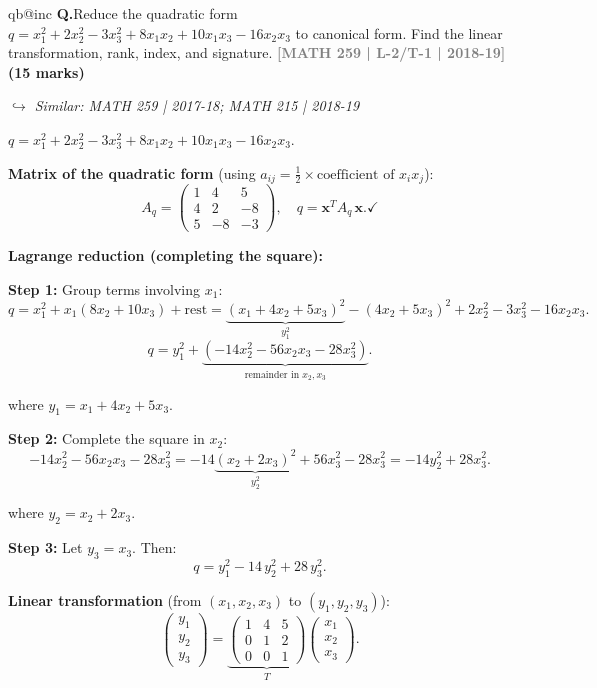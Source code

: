 \documentclass[12pt,a3paper]{article}
\makeatletter
\newcommand{\yr}[1]{\hfill\textcolor{gray}{\small\textbf{[#1]}}}
\newcommand{\mk}[1]{\textcolor{orange!70!black}{\small\textbf{(#1 marks)}}}
\newcommand{\variant}[1]{\par\vspace{1pt}\textcolor{blue!50!black}%
  {\footnotesize\textit{$\hookrightarrow$ Similar: #1}}}
\newcounter{qnum}
\newcommand{\Q}[1]{%
  \csname qb@inc\endcsname
  \needspace{4\baselineskip}
  \refstepcounter{qnum}
  \vspace{6pt}
  \noindent\textbf{Q\theqnum.}\enspace #1\par
}
\makeatother
\begin{document}
\Q{Reduce the quadratic form $q = x_1^2 + 2x_2^2 - 3x_3^2 + 8x_1x_2 + 10x_1x_3 - 16x_2x_3$ to canonical form. Find the linear transformation, rank, index, and signature.
\yr{MATH 259 | L-2/T-1 | 2018-19} \mk{15}
\variant{MATH 259 | 2017-18; MATH 215 | 2018-19}}

\begin{tcolorbox}[enhanced,breakable,
  colback=cE!4,colframe=cE,boxrule=0.8pt,arc=5pt,
  title={\textbf{Answer --- Quadratic Form: Canonical Reduction, Rank, Index, Signature}},
  fonttitle=\bfseries\color{white},colbacktitle=cE]
 
$q = x_1^2+2x_2^2-3x_3^2+8x_1x_2+10x_1x_3-16x_2x_3$.
 
\textbf{Matrix of the quadratic form} (using $a_{ij}=\tfrac{1}{2}\times\text{coefficient of }x_ix_j$):
\[
A_q = \begin{pmatrix}1&4&5\\4&2&-8\\5&-8&-3\end{pmatrix}, \quad
q = \mathbf{x}^T A_q\,\mathbf{x}. \checkmark
\]
 
\medskip
\textbf{Lagrange reduction (completing the square):}
 
\textbf{Step 1:} Group terms involving $x_1$:
\[
q = x_1^2 + x_1(8x_2+10x_3) + \text{rest} = \underbrace{(x_1+4x_2+5x_3)^2}_{y_1^2} - (4x_2+5x_3)^2 + 2x_2^2-3x_3^2-16x_2x_3.
\]
\[
q = y_1^2 + \underbrace{(-14x_2^2-56x_2x_3-28x_3^2)}_{\text{remainder in }x_2,x_3}.
\]
 
where $y_1 = x_1+4x_2+5x_3$.
 
\textbf{Step 2:} Complete the square in $x_2$:
\[
-14x_2^2-56x_2x_3-28x_3^2 = -14\underbrace{(x_2+2x_3)^2}_{y_2^2} + 56x_3^2-28x_3^2 = -14y_2^2 + 28x_3^2.
\]
 
where $y_2 = x_2+2x_3$.
 
\textbf{Step 3:} Let $y_3=x_3$. Then:
\[
\boxed{q = y_1^2 - 14\,y_2^2 + 28\,y_3^2.}
\]
 
\medskip
\textbf{Linear transformation} (from $(x_1,x_2,x_3)$ to $(y_1,y_2,y_3)$):
\[
\begin{pmatrix}y_1\\y_2\\y_3\end{pmatrix}
= \underbrace{\begin{pmatrix}1&4&5\\0&1&2\\0&0&1\end{pmatrix}}_{T}
\begin{pmatrix}x_1\\x_2\\x_3\end{pmatrix}.
\]
 

\end{tcolorbox}
\end{document}
